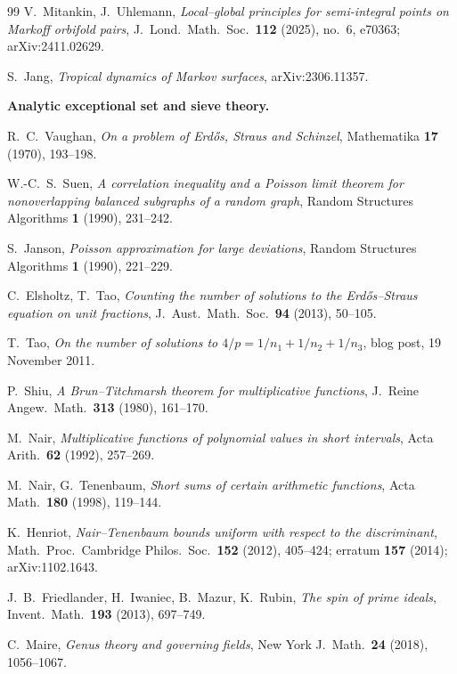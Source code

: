 \documentclass[11pt]{article}
\theoremstyle{plain}
\theoremstyle{definition}
\theoremstyle{remark}
\renewcommand{\_}{\textunderscore\allowbreak}
\begin{document}
\begin{thebibliography}{99}
 V.~Mitankin, J.~Uhlemann, \emph{Local--global principles for
semi-integral points on Markoff orbifold pairs}, J.\ Lond.\ Math.\ Soc.\ \textbf{112} (2025),
no.~6, e70363; arXiv:2411.02629.

 S.~Jang, \emph{Tropical dynamics of Markov surfaces}, arXiv:2306.11357.

\bigskip\noindent\textbf{Analytic exceptional set and sieve theory.}

 R.~C.~Vaughan, \emph{On a problem of Erd\H{o}s, Straus and Schinzel},
Mathematika \textbf{17} (1970), 193--198.

 W.-C.~S.~Suen, \emph{A correlation inequality and a Poisson limit theorem for
nonoverlapping balanced subgraphs of a random graph}, Random Structures Algorithms \textbf{1}
(1990), 231--242.

 S.~Janson, \emph{Poisson approximation for large deviations}, Random
Structures Algorithms \textbf{1} (1990), 221--229.

 C.~Elsholtz, T.~Tao, \emph{Counting the number of solutions to the
Erd\H{o}s--Straus equation on unit fractions}, J.\ Aust.\ Math.\ Soc.\ \textbf{94} (2013), 50--105.

 T.~Tao, \emph{On the number of solutions to $4/p=1/n_1+1/n_2+1/n_3$}, blog
post, 19 November 2011.

 P.~Shiu, \emph{A Brun--Titchmarsh theorem for multiplicative functions}, J.\
Reine Angew.\ Math.\ \textbf{313} (1980), 161--170.

 M.~Nair, \emph{Multiplicative functions of polynomial values in short
intervals}, Acta Arith.\ \textbf{62} (1992), 257--269.

 M.~Nair, G.~Tenenbaum, \emph{Short sums of certain arithmetic
functions}, Acta Math.\ \textbf{180} (1998), 119--144.

 K.~Henriot, \emph{Nair--Tenenbaum bounds uniform with respect to the
discriminant}, Math.\ Proc.\ Cambridge Philos.\ Soc.\ \textbf{152} (2012), 405--424; erratum
\textbf{157} (2014); arXiv:1102.1643.

 J.~B.~Friedlander, H.~Iwaniec, B.~Mazur, K.~Rubin, \emph{The spin of prime
ideals}, Invent.\ Math.\ \textbf{193} (2013), 697--749.

 C.~Maire, \emph{Genus theory and governing fields}, New York J.\ Math.\
\textbf{24} (2018), 1056--1067.


\end{thebibliography}
\end{document}
